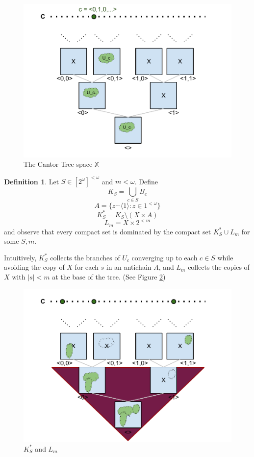\documentclass[11pt]{article}
\theoremstyle{plain}
\theoremstyle{definition}
\newtheorem{definition}[theorem]{Definition}
\theoremstyle{remark}
\newcommand{\<}{\langle}
\renewcommand{\>}{\rangle}
\begin{document}
\begin{figure}[p]
  \centering
  \includegraphics[width=6in]{cantor_tree_open.pdf}
  \caption{The Cantor Tree space $\mathbb{X}$}
  \label{fig:cantor_tree}
\end{figure}

\begin{definition}
Let $S\in[2^\omega]^{<\omega}$ and $m<\omega$. Define 
  \[
    K_S = \bigcup_{c \in S} B_c
  \] 
  \[ 
    A = \{z^\frown \<1\> : z \in 1^{<\omega}\}
  \] 
  \[ 
    K^*_S = K_S \setminus (X \times A)
  \] 
  \[
    L_m = X \times 2^{<m}
  \] 
and observe that every compact set is dominated by the compact set $K^*_S \cup L_m$ for some $S,m$.

Intuitively, $K^*_S$ collects the branches of $U_c$ converging up to each $c \in S$ while avoiding the copy of $X$ for each $s$ in an antichain $A$, and $L_m$ collects the copies of $X$ with $|s| < m$ at the base of the tree. (See Figure \ref{fig:cantor_tree_compact})
\end{definition}

\begin{figure}[p]
  \centering
  \includegraphics[width=6in]{cantor_tree_compact.pdf}
  \caption{$K^*_S$ and $L_m$}
  \label{fig:cantor_tree_compact}
\end{figure}
\end{document}

